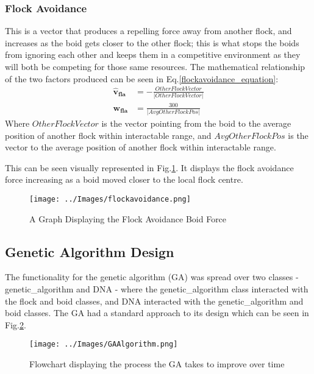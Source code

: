 \subsubsection{Flock Avoidance}
This is a vector that produces a repelling force away from another flock, and increases as the boid gets closer to the other flock; this is what stops the boids from ignoring each other and keeps them in a competitive environment as they will both be competing for those same resources. The mathematical relationship of the two factors produced can be seen in Eq.\ref{flockavoidance_equation}:
\begin{equation}
\begin{split}
\boldsymbol{\hat{v}_{fla}} &= -\frac{OtherFlockVector} {|OtherFlockVector|} \\
\boldsymbol{w_{fla}} &= \frac{300} {|AvgOtherFlockPos|}
\end{split}
\label{flockavoidance_equation}
\end{equation}
Where $OtherFlockVector$ is the vector pointing from the boid to the average position of another flock within interactable range, and $AvgOtherFlockPos$ is the vector to the average position of another flock within interactable range.

This can be seen visually represented in Fig.\ref{fig:flockavoidance}. It displays the flock avoidance force increasing as a boid moved closer to the local flock centre.
\begin{figure}[H]
	\texttt{[image: ../Images/flockavoidance.png]}
	\caption{A Graph Displaying the Flock Avoidance Boid Force}
	\label{fig:flockavoidance}
\end{figure}


\subsection{Genetic Algorithm Design}
The functionality for the genetic algorithm (GA) was spread over two classes - genetic\_algorithm and DNA - where the genetic\_algorithm class interacted with the flock and boid classes, and DNA interacted with the genetic\_algorithm and boid classes. The GA had a standard approach to its design which can be seen in Fig.\ref{fig:geneticflow}.
\begin{figure}[H]
	\texttt{[image: ../Images/GAAlgorithm.png]}
	\caption{Flowchart displaying the process the GA takes to improve over time}
	\label{fig:geneticflow}
\end{figure}

